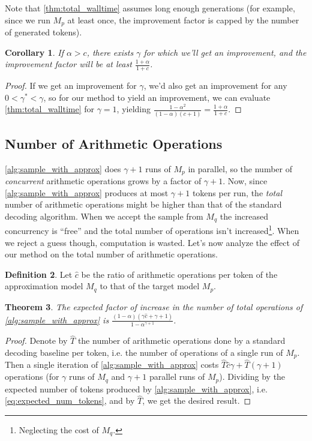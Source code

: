 \documentclass[nohyperref]{article}
\theoremstyle{plain}
\newtheorem{theorem}{Theorem}[section]
\newtheorem{corollary}[theorem]{Corollary}
\theoremstyle{definition}
\newtheorem{definition}[theorem]{Definition}
\theoremstyle{remark}
\begin{document}
Note that \cref{thm:total_walltime} assumes long enough generations (for example, since we run $M_p$ at least once, the improvement factor is capped by the number of generated tokens).

\begin{corollary}
\label{lemma:condition_for_improvement}
If $\alpha > c$, there exists $\gamma$ for which we'll get an improvement, and the improvement factor will be at least $\frac{1 + \alpha}{1 + c}$.
\end{corollary}
\begin{proof}
If we get an improvement for $\gamma$, we’d also get an improvement for any $0 < \gamma^* < \gamma$, so for our method to yield an improvement, we can evaluate \cref{thm:total_walltime} for $\gamma=1$, yielding $\frac{1 - \alpha^2}{(1-\alpha)(c + 1)} = \frac{1 + \alpha}{1 + c}$.
\end{proof}

\subsection{Number of Arithmetic Operations}
\label{sec:arithmetic_ops}

\cref{alg:sample_with_approx} does $\gamma + 1$ runs of $M_p$ in parallel, so the number of \emph{concurrent} arithmetic operations grows by a factor of $\gamma + 1$.
Now, since \cref{alg:sample_with_approx} produces at most $\gamma + 1$ tokens per run, the \emph{total} number of arithmetic operations might be higher than that of the standard decoding algorithm.
When we accept the sample from $M_q$ the increased concurrency is ``free'' and the total number of operations isn't increased\footnote{Neglecting the cost of $M_q$.}. When we reject a guess though, computation is wasted.
Let's now analyze the effect of our method on the total number of arithmetic operations.

\begin{definition}
Let $\hat{c}$ be the ratio of arithmetic operations per token of the approximation model $M_q$ to that of the target model $M_p$.
\end{definition}

\begin{theorem}
\label{thm:num_ops}
The expected factor of increase in the number of total operations of \cref{alg:sample_with_approx} is $\frac{(1-\alpha)({\gamma}\hat{c} + \gamma + 1)}{1 - \alpha^{\gamma + 1}}$.
\end{theorem}

\begin{proof}
Denote by $\hat{T}$ the number of arithmetic operations done by a standard decoding baseline per token, i.e. the number of operations of a single run of $M_p$. Then a single iteration of \cref{alg:sample_with_approx} costs $\hat{T}\hat{c}\gamma + \hat{T}(\gamma + 1)$ operations (for $\gamma$ runs of $M_q$ and $\gamma + 1$ parallel runs of $M_p$). Dividing by the expected number of tokens produced by \cref{alg:sample_with_approx}, i.e. \cref{eq:expected_num_tokens}, and by $\hat{T}$, we get the desired result.
\end{proof}
\end{document}
